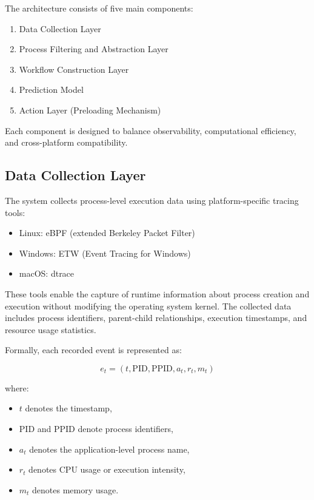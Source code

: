 \documentclass[11pt]{article}
\begin{document}
The architecture consists of five main components:

\begin{enumerate}
\item Data Collection Layer
\item Process Filtering and Abstraction Layer
\item Workflow Construction Layer
\item Prediction Model
\item Action Layer (Preloading Mechanism)
\end{enumerate}

Each component is designed to balance observability, computational efficiency, and cross-platform compatibility.

\subsection{Data Collection Layer}

The system collects process-level execution data using platform-specific tracing tools:

\begin{itemize}
\item Linux: eBPF (extended Berkeley Packet Filter)
\item Windows: ETW (Event Tracing for Windows)
\item macOS: dtrace
\end{itemize}

These tools enable the capture of runtime information about process creation and execution without modifying the operating system kernel. The collected data includes process identifiers, parent-child relationships, execution timestamps, and resource usage statistics.

Formally, each recorded event is represented as:

\[
e_t = (t, \text{PID}, \text{PPID}, a_t, r_t, m_t)
\]

where:
\begin{itemize}
\item $t$ denotes the timestamp,
\item $\text{PID}$ and $\text{PPID}$ denote process identifiers,
\item $a_t$ denotes the application-level process name,
\item $r_t$ denotes CPU usage or execution intensity,
\item $m_t$ denotes memory usage.
\end{itemize}
\end{document}

